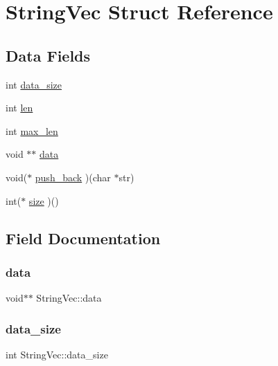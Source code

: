 \hypertarget{struct_string_vec}{}\section{String\+Vec Struct Reference}
\label{struct_string_vec}
\subsection*{Data Fields}
\begin{DoxyCompactItemize}
\item 
int \hyperlink{struct_string_vec_a4833997da46043501e6fbfafaa01dabf}{data\+\_\+size}
\item 
int \hyperlink{struct_string_vec_a7c24f16a046318d0be2902e0b40f07e4}{len}
\item 
int \hyperlink{struct_string_vec_a78df5c5f47656d385e2f6d1f2e9ed62b}{max\+\_\+len}
\item 
void $\ast$$\ast$ \hyperlink{struct_string_vec_a4ee18d189b50df8546029601ef1b76da}{data}
\item 
void($\ast$ \hyperlink{struct_string_vec_a8034d98a50a5e9d365f40cf93a80f625}{push\+\_\+back} )(char $\ast$str)
\item 
int($\ast$ \hyperlink{struct_string_vec_ab333b455c70e0234322232afe7b8ec24}{size} )()
\end{DoxyCompactItemize}


\subsection{Field Documentation}
\mbox{\label{struct_string_vec_a4ee18d189b50df8546029601ef1b76da}} 
\subsubsection{\texorpdfstring{data}{data}}
{\footnotesize\ttfamily void$\ast$$\ast$ String\+Vec\+::data}

\mbox{\label{struct_string_vec_a4833997da46043501e6fbfafaa01dabf}} 
\subsubsection{\texorpdfstring{data\+\_\+size}{data\_size}}
{\footnotesize\ttfamily int String\+Vec\+::data\+\_\+size}

